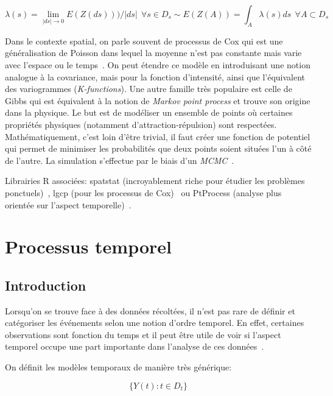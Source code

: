 \begin{equation}
    \lambda(s) = \lim_{|ds| \to 0} E(Z(ds))) / |ds| ~~ \forall s \in D_{s} \sim E(Z(A)) = \int_{A} \lambda(s) ds ~~ \forall A \subset D_{s}
\end{equation}

Dans le contexte spatial, on parle souvent de processus de Cox qui est une généralisation de Poisson dans lequel la moyenne n'est pas constante mais varie avec l'espace ou le temps~\cite{cox1955some}. On peut étendre ce modèle en introduisant une notion analogue à la covariance, mais pour la fonction d'intensité, ainsi que l'équivalent des variogrammes (\textit{K-functions}). Une autre famille très populaire est celle de Gibbs qui est équivalent à la notion de \textit{Markov point process} et trouve son origine dans la physique. Le but est de modéliser un ensemble de points où certaines propriétés physiques (notamment d'attraction-répulsion) sont respectées. Mathématiquement, c'est loin d'être trivial, il faut créer une fonction de potentiel qui permet de minimiser les probabilités que deux points soient situées l'un à côté de l'autre. La simulation s'effectue par le biais d'un \textit{MCMC}~\cite{illian2008statistical}.

Librairies R associées: spatstat (incroyablement riche pour étudier les problèmes ponctuels)~\cite{baddeley2016spatial}, lgcp (pour les processus de Cox)~\cite{lgcp} ou PtProcess (analyse plus orientée sur l'aspect temporelle)~\cite{ptprocess}.

\section{Processus temporel}

\subsection{Introduction}

Lorsqu'on se trouve face à des données récoltées, il n'est pas rare de définir et catégoriser les événements selon une notion d'ordre temporel. En effet, certaines observations sont fonction du temps et il peut être utile de voir si l'aspect temporel occupe une part importante dans l'analyse de ces données~\cite{kendall1946advanced}.

On définit les modèles temporaux de manière très générique:

\begin{equation}
    \{ Y(t) : t \in D_{t} \}
\end{equation}

